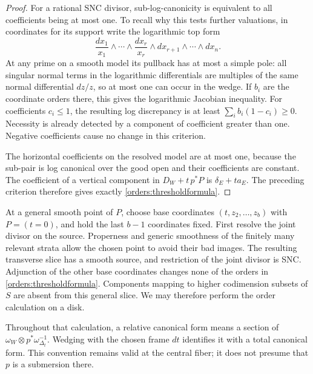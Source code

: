 \begin{proof}
For a rational SNC divisor, sub-log-canonicity is equivalent to all
coefficients being at most one.  To recall why this tests further
valuations, in coordinates for its support write the logarithmic
top form
\[
 \frac{dx_1}{x_1}\wedge\cdots\wedge\frac{dx_r}{x_r}
 \wedge dx_{r+1}\wedge\cdots\wedge dx_n.
\]
At any prime on a smooth model its pullback has at most a simple
pole: all singular normal terms in the logarithmic differentials
are multiples of the same normal differential \(dz/z\), so at
most one can occur in the wedge.  If \(b_i\) are the coordinate
orders there, this gives the logarithmic Jacobian inequality.
For coefficients \(c_i\leq1\), the resulting log discrepancy is at
least \(\sum_i b_i(1-c_i)\geq0\).  Necessity is already detected
by a component of coefficient greater than one.  Negative
coefficients cause no change in this criterion.

The horizontal coefficients on the resolved model are at most one,
because the sub-pair is log canonical over the good open and their
coefficients are constant.  The coefficient of a vertical component
in \(D_W+t\,p^*P\) is \(\delta_E+ta_E\).  The preceding criterion
therefore gives exactly \eqref{orders:thresholdformula}.
\end{proof}

At a general smooth point of \(P\), choose base coordinates
\((t,z_2,\ldots,z_b)\) with \(P=(t=0)\), and hold the last \(b-1\)
coordinates fixed.  First resolve the joint divisor on the source.
Properness and generic smoothness of the finitely many relevant
strata allow the chosen point to avoid their bad images.  The
resulting transverse slice has a smooth source, and restriction of
the joint divisor is SNC.  Adjunction of the other base coordinates
changes none of the orders in
\eqref{orders:thresholdformula}.  Components mapping to higher
codimension subsets of \(S\) are absent from this general slice.
We may therefore perform the order calculation on a disk.

Throughout that calculation, a relative canonical form means a
section of
\(\omega_W\otimes p^*\omega_{\Delta_t}^{-1}\).
Wedging with the chosen frame \(dt\) identifies it with a total
canonical form.  This convention remains valid at the central
fiber; it does not presume that \(p\) is a submersion there.

